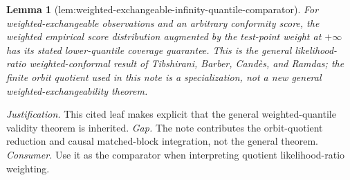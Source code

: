 \documentclass{article}
\newtheorem{lemma}{Lemma}
\begin{document}
\begin{lemma}[lem:weighted-exchangeable-infinity-quantile-comparator]\label{lem:weighted-exchangeable-infinity-quantile-comparator}
For weighted-exchangeable observations and an arbitrary conformity score, the weighted empirical score distribution augmented by the test-point weight at \(+\infty\) has its stated lower-quantile coverage guarantee. This is the general likelihood-ratio weighted-conformal result of Tibshirani, Barber, Candès, and Ramdas; the finite orbit quotient used in this note is a specialization, not a new general weighted-exchangeability theorem.
\end{lemma}
\par\smallskip\noindent \textit{Justification.} This cited leaf makes explicit that the general weighted-quantile validity theorem is inherited. \textit{Gap.} The note contributes the orbit-quotient reduction and causal matched-block integration, not the general theorem. \textit{Consumer.} Use it as the comparator when interpreting quotient likelihood-ratio weighting.
\end{document}
